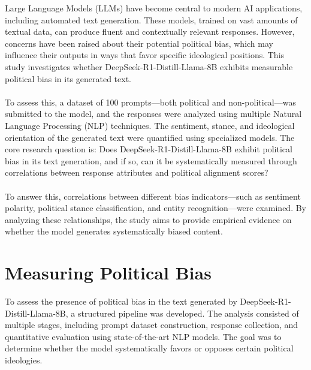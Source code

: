 \documentclass[pdflatex,sn-mathphys-num]{sn-jnl}%
\theoremstyle{thmstyleone}%
\theoremstyle{thmstyletwo}%
\theoremstyle{thmstylethree}%
\begin{document}
Large Language Models (LLMs) have become central to modern AI applications, including automated text generation. These models, trained on vast amounts of textual data, can produce fluent and contextually relevant responses. However, concerns have been raised about their potential political bias, which may influence their outputs in ways that favor specific ideological positions. This study investigates whether DeepSeek-R1-Distill-Llama-8B\cite{deepseekai2025deepseekr1incentivizingreasoningcapability} exhibits measurable political bias in its generated text.
\\\\
To assess this, a dataset of 100 prompts—both political and non-political—was submitted to the model, and the responses were analyzed using multiple Natural Language Processing (NLP) techniques. The sentiment, stance, and ideological orientation of the generated text were quantified using specialized models. The core research question is: Does DeepSeek-R1-Distill-Llama-8B exhibit political bias in its text generation, and if so, can it be systematically measured through correlations between response attributes and political alignment scores?\cite{bar-haim-etal-2017-stance}
\\\\
To answer this, correlations between different bias indicators—such as sentiment polarity, political stance classification, and entity recognition—were examined. By analyzing these relationships, the study aims to provide empirical evidence on whether the model generates systematically biased content.

\section{Measuring Political Bias}\label{sec2}

To assess the presence of political bias in the text generated by DeepSeek-R1-Distill-Llama-8B, a structured pipeline was developed. The analysis consisted of multiple stages, including prompt dataset construction, response collection, and quantitative evaluation using state-of-the-art NLP models. The goal was to determine whether the model systematically favors or opposes certain political ideologies.  
\end{document}
